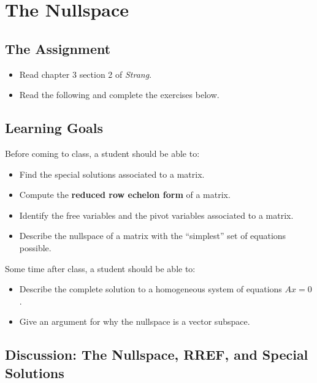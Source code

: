 \documentclass[10pt,]{book}
\newcommand{\terminology}[1]{\textbf{#1}}
\theoremstyle{plain}
\numberwithin{equation}{section}
\begin{document}
\section[The Nullspace]{The Nullspace}\label{nullspace}
\typeout{************************************************}
\typeout{************************************************}
\subsection[The Assignment]{The Assignment}\label{subsection-63}
\begin{itemize}
\item{}Read chapter 3 section 2 of \emph{Strang}.\item{}Read the following and complete the exercises below.\end{itemize}
\typeout{************************************************}
\typeout{************************************************}
\subsection[Learning Goals]{Learning Goals}\label{subsection-64}
Before coming to class, a student should be able to:%
\begin{itemize}
\item{}Find the special solutions associated to a matrix.\item{}Compute the \terminology{reduced row echelon form} of a matrix.\item{}Identify the free variables and the pivot variables associated to
        a matrix.
      \item{}
        Describe the nullspace of a matrix with the ``simplest'' set of
        equations possible.
      \end{itemize}
\par
Some time after class, a student should be able to:%
\begin{itemize}
\item{}Describe the complete solution to a homogeneous system of equations
        \(Ax = 0\).
      \item{}Give an argument for why the nullspace is a vector subspace.\end{itemize}
\typeout{************************************************}
\typeout{************************************************}
\subsection[Discussion: The Nullspace, RREF, and Special Solutions]{Discussion: The Nullspace, RREF, and Special Solutions}\label{subsection-65}
\end{document}
